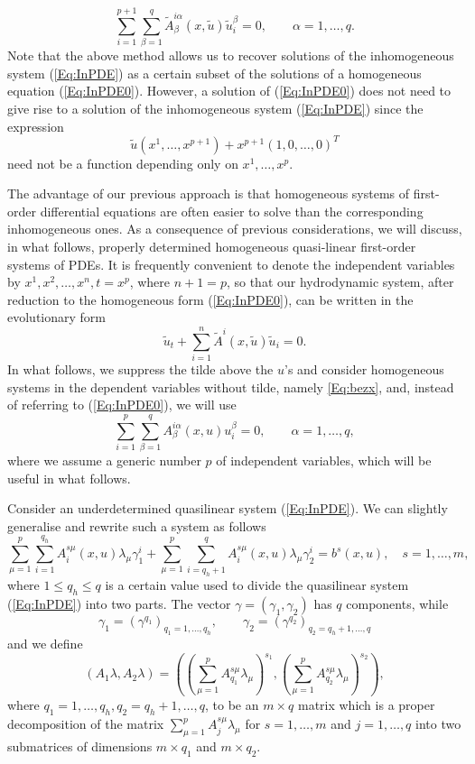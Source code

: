 \documentclass{birkjour}
\theoremstyle{definition}
\theoremstyle{remark}
\numberwithin{equation}{section}
\numberwithin{equation}{section}
\numberwithin{thm}{section}
\numberwithin{equation}{section}
\numberwithin{thm}{section}
\begin{document}
\begin{equation}\label{Eq:InPDE0}
	\sum_{i=1}^{p+1}\sum_{\beta=1}^q\tilde A^{i\alpha}_\beta(x,\tilde{u})\tilde{u}^\beta_i=0,\qquad \alpha=1,\ldots,q.
\end{equation}
Note that the above method allows us to recover solutions of the inhomogeneous system (\ref{Eq:InPDE}) as a certain subset of the solutions of a homogeneous equation (\ref{Eq:InPDE0}). However, a solution of (\ref{Eq:InPDE0}) does not need to give rise to a solution of the inhomogeneous system (\ref{Eq:InPDE}) since the expression
$$
\widetilde{u}(x^1,\ldots,x^{p+1})+x^{p+1}(1,0,\ldots,0)^T
$$
need not be a function depending only on $x^1,\ldots,x^p$.

The advantage of our previous approach is that homogeneous systems of first-order differential equations are often easier to solve than the corresponding inhomogeneous ones. 
As a consequence of previous considerations, we will discuss, in what follows, properly determined homogeneous quasi-linear first-order systems of PDEs. It is frequently convenient to denote the independent variables by $x^{1},x^2,\ldots,x^n, t=x^p$, where $n+1=p$, so that our hydrodynamic system, after reduction to the homogeneous form (\ref{Eq:InPDE0}), can be written in the evolutionary form 
$$
\tilde u_t+\sum_{i=1}^n\tilde{A}^i(x,\tilde u)\tilde u_i=0.
$$
In what follows, we suppress the tilde above the $u$'s and consider homogeneous systems in the dependent variables without tilde, namely \eqref{Eq:bezx}, 
and, instead of referring to (\ref{Eq:InPDE0}), we will use 
\begin{equation}\label{Eq:InPDE02}
	\sum_{i=1}^{p}\sum_{\beta=1}^q A^{i\alpha}_\beta(x,{u}){u}^\beta_i=0,\qquad \alpha=1,\ldots,q,
\end{equation}
where we assume  a generic number $p$ of independent variables, which will be useful in what follows.

Consider an underdetermined quasilinear system (\ref{Eq:InPDE}). We can slightly generalise and rewrite such a system as follows
$$
\sum_{\mu=1}^p\sum_{i=1}^{q_h}A_i^{s\mu}(x,u)\lambda_{\mu}\gamma_1^i+\sum_{\mu=1}^p\sum_{i=q_h+1}^qA^{s\mu}_i(x,u)\lambda_{\mu}\gamma^i_2=b^s(x,u),\quad s=1,\ldots,m,
$$
where $1\leq q_h\leq q$ is a certain value used to divide the quasilinear system (\ref{Eq:InPDE}) into two parts. 
The vector $\gamma=(\gamma_1,\gamma_2)$ has $q$ components, while
$$
\gamma_1=(\gamma^{q_1})_{q_1=1,\ldots,q_h},\qquad \gamma_2=(\gamma^{q_2})_{q_2=q_h+1,\ldots,q}
$$
and we define
$$
(A_1\lambda ,A_2\lambda )=\left(\left(\sum_{\mu=1}^pA^{s\mu}_{q_1}\lambda_\mu\right)^{s_1},\left(\sum_{\mu=1}^pA^{s\mu}_{q_2}\lambda_\mu\right)^{s_2}\right),
$$
where $q_1=1,\ldots,q_h,q_2=q_h+1,\ldots,q$, to be an $m\times q$ matrix which is a proper decomposition of the matrix $\sum_{\mu=1}^pA^{s\mu}_j\lambda_{\mu}$ for $s=1,\ldots,m$ and $j=1,\ldots,q$ into two submatrices of dimensions $m\times q_1$ and $m\times q_2$.
\end{document}
